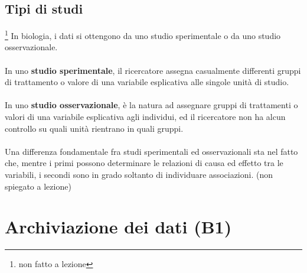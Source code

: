\documentclass[10pt, draft]{book}
\begin{document}
\section{Tipi di studi}\footnote{non fatto a lezione}
In biologia, i dati si ottengono da uno studio sperimentale o da uno studio osservazionale.
\\
\\
In uno \textbf{studio sperimentale}, il ricercatore assegna casualmente differenti gruppi di trattamento o valore di una variabile esplicativa alle singole unità di studio.
\\
\\
In uno \textbf{studio osservazionale}, è la natura ad assegnare gruppi di trattamenti o valori di una variabile esplicativa agli individui, ed il ricercatore non ha alcun controllo su quali unità rientrano in quali gruppi.
\\
\\
Una differenza fondamentale fra studi sperimentali ed osservazionali sta nel fatto che, mentre i primi possono determinare le relazioni di causa ed effetto tra le variabili, i secondi sono in grado soltanto di individuare associazioni.
(non spiegato a lezione)

\chapter{Archiviazione dei dati (B1)}
\end{document}
